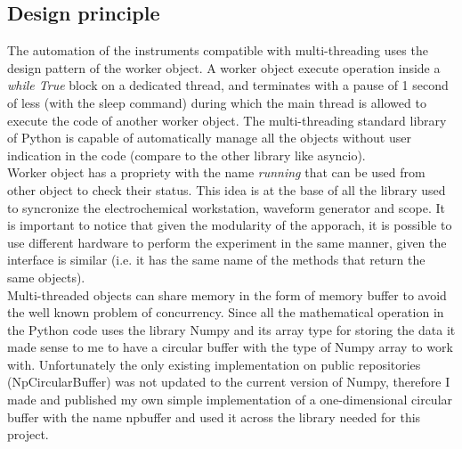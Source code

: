 \subsection{Design principle}
The automation of the instruments compatible with multi-threading uses the design pattern of the worker object. A worker object execute operation inside a \emph{while True} block on a dedicated thread, and terminates with a pause of 1 second of less (with the sleep command) during which the main thread is allowed to execute the code of another worker object. The multi-threading standard library of Python is capable of automatically manage all the objects without user indication in the code (compare to the other library like asyncio). \\
Worker object has a propriety with the name \emph{running} that can be used from other object to check their status. This idea is at the base of all the library used to syncronize the electrochemical workstation, waveform generator and scope. It is important to notice that given the modularity of the apporach, it is possible to use different hardware to perform the experiment in the same manner, given the interface is similar (i.e. it has the same name of the methods that return the same objects).\\
Multi-threaded objects can share memory in the form of memory buffer to avoid the well known problem of concurrency. Since all the mathematical operation in the Python code uses the library Numpy and its array type for storing the data it made sense to me to have a circular buffer with the type of Numpy array to work with. Unfortunately the only existing implementation on public repositories (NpCircularBuffer) was not updated to the current version of Numpy, therefore I made and published my own simple implementation of a one-dimensional circular buffer with the name npbuffer and used it across the library needed for this project.\\
